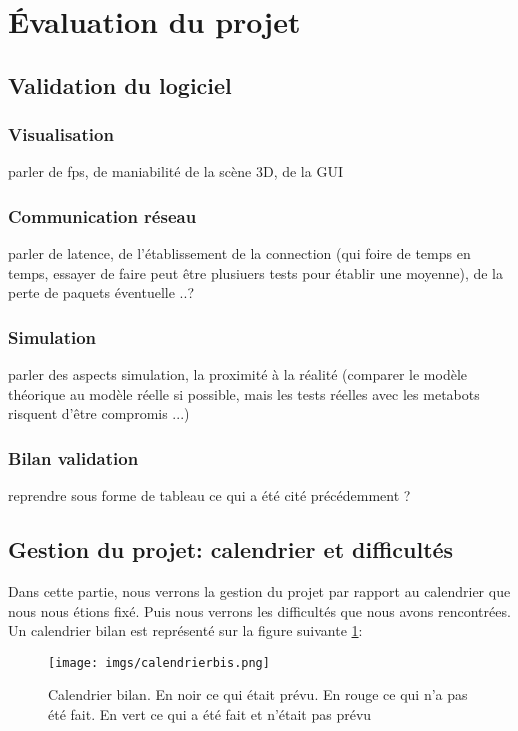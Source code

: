 \section{Évaluation du projet}
\subsection{Validation du logiciel} %
\subsubsection{Visualisation}
parler de fps, de maniabilité de la scène 3D, de la GUI

\subsubsection{Communication réseau}
parler de latence, de l'établissement de la connection (qui foire de temps en temps, essayer de faire peut être plusiuers tests pour établir une moyenne), de la perte de paquets éventuelle ..?

\subsubsection{Simulation}
parler des aspects simulation, la proximité à la réalité (comparer le modèle théorique au modèle réelle si possible, mais les tests réelles avec les metabots risquent d'être compromis ...)

\subsubsection{Bilan validation}
reprendre sous forme de tableau ce qui a été cité précédemment ?

\subsection{Gestion du projet: calendrier et difficultés}

Dans cette partie, nous verrons la gestion du projet par rapport au calendrier que nous nous étions fixé. Puis nous verrons les difficultés que nous avons rencontrées. Un calendrier bilan est représenté sur la figure suivante \ref{cal}:

\begin{figure}[H]
  \begin{center}
  	\texttt{[image: imgs/calendrierbis.png]}
  	\caption{Calendrier bilan. En noir ce qui était prévu. En rouge ce qui n'a pas été fait. En vert ce qui a été fait et n'était pas prévu}
  	\label{cal}
  \end{center}
\end{figure}

